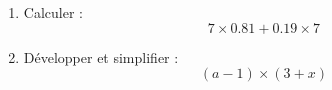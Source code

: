 
\begin{mental}
    \begin{enumerate}
        \item
            Calculer : 
            \begin{equation}
               7\times 0.81+0.19\times 7
            \end{equation}
        \item
            Développer et simplifier :
            \begin{equation}
                (a-1)\times (3+x)
            \end{equation}
    \end{enumerate}
\end{mental}
